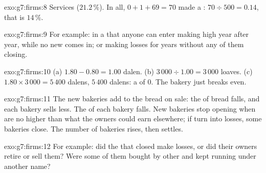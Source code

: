 \begin{solution}{exo:g7:firms:8}
Services ($21.2\,\%$). In all, $0 + 1 + 69 = 70$  made a : $70 \div 500 = 0.14$, that is
$14\,\%$.
\end{solution}

\begin{solution}{exo:g7:firms:9}
For example:  in a  that anyone can enter making high  year after year, while
no new  comes in; or  making losses for years without any of them closing.
\end{solution}

\begin{solution}{exo:g7:firms:10}
(a) $1.80 - 0.80 = 1.00$ dalen. (b) $3\,000 \div 1.00 = 3\,000$ loaves. (c)  $1.80 \times
3\,000 = 5\,400$ dalens,  $5\,400$ dalens: a  of 0. The bakery just breaks even.
\end{solution}

\begin{solution}{exo:g7:firms:11}
The new bakeries add to the bread on sale: the  of bread falls, and each bakery sells less.
The  of each bakery falls. New bakeries stop opening when  are no higher than what
the owners could earn elsewhere; if  turn into losses, some bakeries close. The number of
bakeries rises, then settles.
\end{solution}

\begin{solution}{exo:g7:firms:12}
For example: did the  that closed make losses, or did their owners retire or sell them? Were
some of them bought by other  and kept running under another name?
\end{solution}

